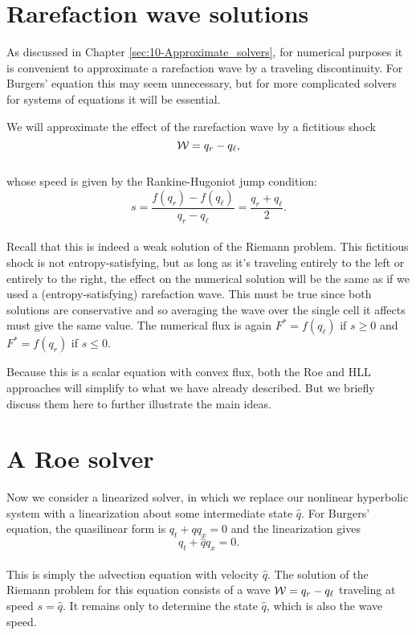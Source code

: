 \documentclass{SIAMbook2016}
\begin{document}
\hypertarget{rarefaction-wave-solutions}{%
\section{Rarefaction wave solutions}\label{rarefaction-wave-solutions}}

As discussed in Chapter \ref{sec:10-Approximate_solvers}, for numerical
purposes it is convenient to approximate a rarefaction wave by a
traveling discontinuity. For Burgers' equation this may seem
unnecessary, but for more complicated solvers for systems of equations
it will be essential.

We will approximate the effect of the rarefaction wave by a fictitious
shock \[{\cal W} = q_r-q_\ell,\]\\
whose speed is given by the Rankine-Hugoniot jump condition:\\
\[s = \frac{f(q_r)-f(q_\ell)}{q_r-q_\ell} = \frac{q_r + q_\ell}{2}.\]\\
Recall that this is indeed a weak solution of the Riemann problem. This
fictitious shock is not entropy-satisfying, but as long as it's
traveling entirely to the left or entirely to the right, the effect on
the numerical solution will be the same as if we used a
(entropy-satisfying) rarefaction wave. This must be true since both
solutions are conservative and so averaging the wave over the single
cell it affects must give the same value. The numerical flux is again
\(F^*=f(q_\ell)\) if \(s\geq 0\) and \(F^*=f(q_r)\) if \(s \leq 0\).

Because this is a scalar equation with convex flux, both the Roe and HLL
approaches will simplify to what we have already described. But we
briefly discuss them here to further illustrate the main ideas.

\hypertarget{a-roe-solver}{%
\section{A Roe solver}\label{a-roe-solver}}

Now we consider a linearized solver, in which we replace our nonlinear
hyperbolic system with a linearization about some intermediate state
\(\hat{q}\). For Burgers' equation, the quasilinear form is
\(q_t + q q_x = 0\) and the linearization gives\\
\[q_t + \hat{q}q_x = 0.\]\\
This is simply the advection equation with velocity \(\hat{q}\). The
solution of the Riemann problem for this equation consists of a wave
\({\cal W} = q_r - q_\ell\) traveling at speed \(s = \hat{q}\). It
remains only to determine the state \(\hat{q}\), which is also the wave
speed.
\end{document}

